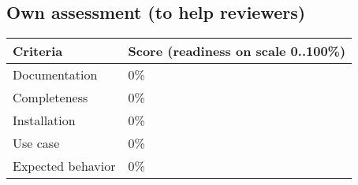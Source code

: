 \documentclass{sigplanconf}
\begin{document}
\subsection{Own assessment (to help reviewers)}

\begin{tabular}{|p{1.0in}|p{1.8in}|}
 \hline

 \textbf{Criteria} & \textbf{Score (readiness on scale 0..100\%)} \\

 \hline
 Documentation & 0\% \\

 \hline
 Completeness & 0\% \\

 \hline
 Installation & 0\% \\

 \hline
 Use case & 0\% \\

 \hline
 Expected behavior & 0\% \\

 \hline
\end{tabular}

\end{document}
